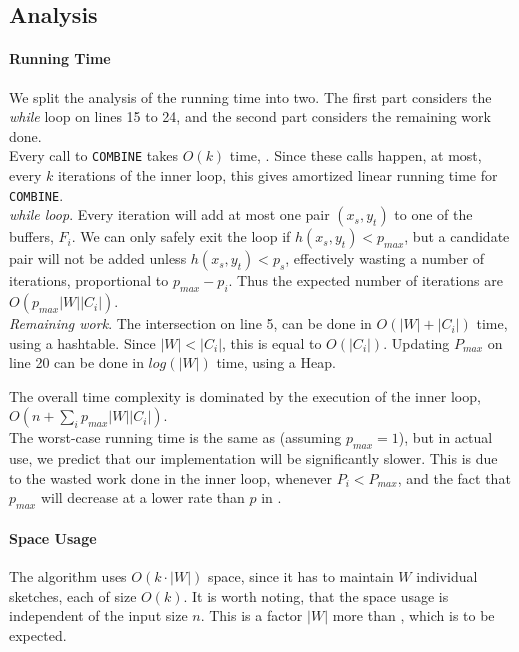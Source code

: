 \documentclass[a4paper,11pt]{article}
\begin{document}
\subsection{Analysis}
\paragraph {Running Time}
We split the analysis of the running time into two.
The first part considers the \emph{while} loop on lines 15 to 24, and the second part considers the remaining work done.\\

Every call to \texttt{COMBINE} takes $O(k)$ time, \cite{paper:amossen}. Since these calls happen, at most, every $k$ iterations of the inner loop, this gives amortized linear running time for \texttt{COMBINE}.\\

\textit{while loop}. Every iteration will add at most one pair $(x_s, y_t)$ to one of the buffers, $F_i$. We can only safely exit the loop if $h(x_s, y_t) < p_{max}$, but a candidate pair will not be added unless $h(x_s, y_t) < p_s$, effectively wasting a number of iterations, proportional to $p_{max}-p_i$. Thus the expected number of iterations are $O(p_{max}|W||C_i|)$.\\

\textit{Remaining work}.
The intersection on line 5, can be done in $O(|W|+|C_i|)$ time, using a hashtable. Since $|W|<|C_i|$, this is equal to $O(|C_i|)$.
Updating $P_{max}$ on line 20 can be done in $log(|W|)$ time, using a Heap.

The overall time complexity is dominated by the execution of the inner loop, $O(n + \sum_i p_{max}|W||C_i|)$.\\

The worst-case running time is the same as \cite{paper:amossen} (assuming $p_{max} = 1$), but in actual use, we predict that our implementation will be significantly slower. This is due to the wasted work done in the inner loop, whenever $P_i < P_{max}$, and the fact that $p_{max}$ will decrease at a lower rate than $p$ in \cite{paper:amossen}.

\paragraph{Space Usage}
The algorithm uses $O(k\cdot|W|)$ space, since it has to maintain $W$ individual sketches, each of size $O(k)$. It is worth noting, that the space usage is independent of the input size $n$. This is a factor $|W|$ more than \cite{paper:amossen}, which is to be expected.
\end{document}
